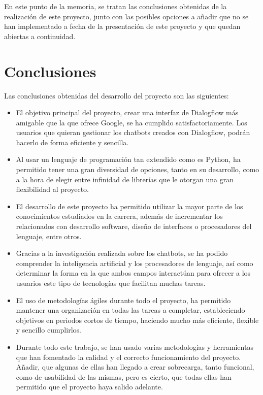 En este punto de la memoria, se tratan las conclusiones obtenidas de la realización de este proyecto, junto con las posibles opciones a añadir que no se han implementado a fecha de la presentación de este proyecto y que quedan abiertas a continuidad.

\section{Conclusiones}
Las conclusiones obtenidas del desarrollo del proyecto son las siguientes:
\begin{itemize}
    \item El objetivo principal del proyecto, crear una interfaz de Dialogflow más amigable que la que ofrece Google, se ha cumplido satisfactoriamente. Los usuarios que quieran gestionar los chatbots creados con Dialogflow, podrán hacerlo de forma eficiente y sencilla.
    \item Al usar un lenguaje de programación tan extendido como es Python, ha permitido tener una gran diversidad de opciones, tanto en su desarrollo, como a la hora de elegir entre infinidad de librerías que le otorgan una gran flexibilidad al proyecto.
    \item El desarrollo de este proyecto ha permitido utilizar la mayor parte de los conocimientos estudiados en la carrera, además de incrementar los relacionados con desarrollo software, diseño de interfaces o procesadores del lenguaje, entre otros.
    \item Gracias a la investigación realizada sobre los chatbots, se ha podido comprender la inteligencia artificial y los procesadores de lenguaje, así como determinar la forma en la que ambos campos interactúan para ofrecer a los usuarios este tipo de tecnologías que facilitan muchas tareas.
    \item El uso de metodologías ágiles durante todo el proyecto, ha permitido mantener una organización en todas las tareas a completar, estableciendo objetivos en periodos cortos de tiempo, haciendo mucho más eficiente, flexible y sencillo cumplirlos.
    \item Durante todo este trabajo, se han usado varias metodologías y herramientas que han fomentado la calidad y el correcto funcionamiento del proyecto. Añadir, que algunas de ellas han llegado a crear sobrecarga, tanto funcional, como de usabilidad de las mismas, pero es cierto, que todas ellas han permitido que el proyecto haya salido adelante.
\end{itemize}

